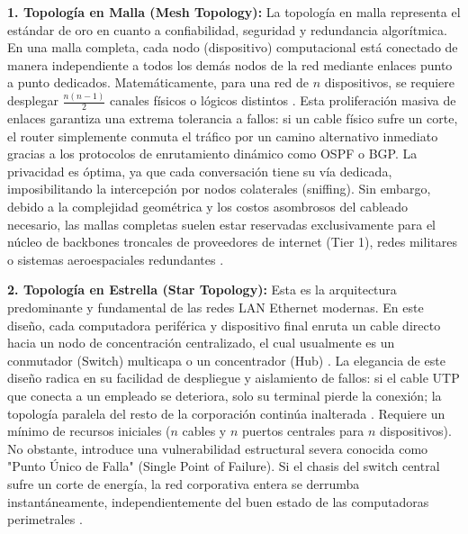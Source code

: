 \documentclass[a4paper,12pt]{article}
\begin{document}
\textbf{1. Topología en Malla (Mesh Topology):} 
La topología en malla representa el estándar de oro en cuanto a confiabilidad, seguridad y redundancia algorítmica. En una malla completa, cada nodo (dispositivo) computacional está conectado de manera independiente a todos los demás nodos de la red mediante enlaces punto a punto dedicados. Matemáticamente, para una red de $n$ dispositivos, se requiere desplegar $\frac{n(n-1)}{2}$ canales físicos o lógicos distintos \cite{topology_geeks}. Esta proliferación masiva de enlaces garantiza una extrema tolerancia a fallos: si un cable físico sufre un corte, el router simplemente conmuta el tráfico por un camino alternativo inmediato gracias a los protocolos de enrutamiento dinámico como OSPF o BGP. La privacidad es óptima, ya que cada conversación tiene su vía dedicada, imposibilitando la intercepción por nodos colaterales (sniffing). Sin embargo, debido a la complejidad geométrica y los costos asombrosos del cableado necesario, las mallas completas suelen estar reservadas exclusivamente para el núcleo de backbones troncales de proveedores de internet (Tier 1), redes militares o sistemas aeroespaciales redundantes \cite{topology_geeks}.

\textbf{2. Topología en Estrella (Star Topology):}
Esta es la arquitectura predominante y fundamental de las redes LAN Ethernet modernas. En este diseño, cada computadora periférica y dispositivo final enruta un cable directo hacia un nodo de concentración centralizado, el cual usualmente es un conmutador (Switch) multicapa o un concentrador (Hub) \cite{topology_geeks}. La elegancia de este diseño radica en su facilidad de despliegue y aislamiento de fallos: si el cable UTP que conecta a un empleado se deteriora, solo su terminal pierde la conexión; la topología paralela del resto de la corporación continúa inalterada \cite{topology_international}. Requiere un mínimo de recursos iniciales ($n$ cables y $n$ puertos centrales para $n$ dispositivos). No obstante, introduce una vulnerabilidad estructural severa conocida como "Punto Único de Falla" (Single Point of Failure). Si el chasis del switch central sufre un corte de energía, la red corporativa entera se derrumba instantáneamente, independientemente del buen estado de las computadoras perimetrales \cite{topology_international, topology_geeks}.
\end{document}
